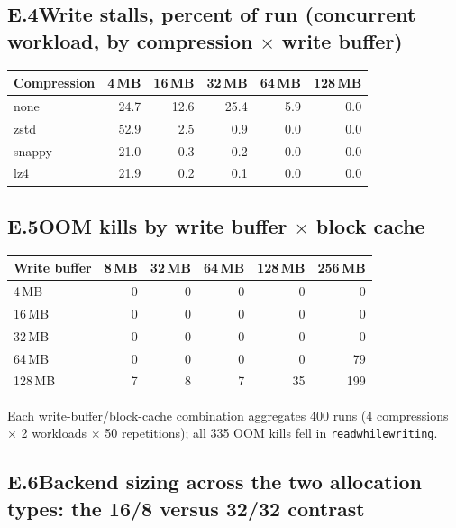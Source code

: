 \subsection*{E.4\quad Write stalls, percent of run (concurrent workload, by compression $\times$ write buffer)}
\begin{center}
\begin{tabular}{|l|r|r|r|r|r|}
\hline
\textbf{Compression} & \textbf{4\,MB} & \textbf{16\,MB} & \textbf{32\,MB} & \textbf{64\,MB} & \textbf{128\,MB} \\
\hline
none   & 24.7 & 12.6 & 25.4 & 5.9 & 0.0 \\
\hline
zstd   & 52.9 & 2.5  & 0.9  & 0.0 & 0.0 \\
\hline
snappy & 21.0 & 0.3  & 0.2  & 0.0 & 0.0 \\
\hline
lz4    & 21.9 & 0.2  & 0.1  & 0.0 & 0.0 \\
\hline
\end{tabular}
\end{center}

\subsection*{E.5\quad OOM kills by write buffer $\times$ block cache}
\begin{center}
\begin{tabular}{|l|r|r|r|r|r|}
\hline
\textbf{Write buffer} & \textbf{8\,MB} & \textbf{32\,MB} & \textbf{64\,MB} & \textbf{128\,MB} & \textbf{256\,MB} \\
\hline
4\,MB   & 0 & 0 & 0 & 0  & 0   \\
\hline
16\,MB  & 0 & 0 & 0 & 0  & 0   \\
\hline
32\,MB  & 0 & 0 & 0 & 0  & 0   \\
\hline
64\,MB  & 0 & 0 & 0 & 0  & 79  \\
\hline
128\,MB & 7 & 8 & 7 & 35 & 199 \\
\hline
\end{tabular}
\end{center}
Each write-buffer/block-cache combination aggregates 400 runs (4 compressions $\times$ 2 workloads $\times$ 50 repetitions); all 335 OOM kills fell in \texttt{readwhilewriting}.

\subsection*{E.6\quad Backend sizing across the two allocation types: the 16/8 versus 32/32 contrast}
\label{app:rb32}\label{sec:rb32}

